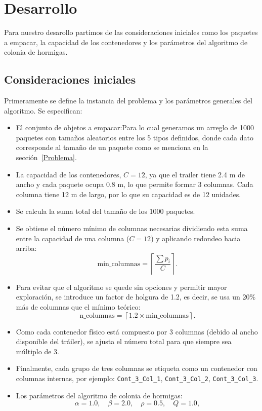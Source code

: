 \section{Desarrollo}

Para nuestro desarollo partimos de las consideraciones iniciales como los paquetes a empacar, la capacidad de los contenedores y los parámetros del 
algoritmo de colonia de hormigas.

\subsection{Consideraciones iniciales}

Primeramente se define la instancia del problema y los parámetros generales del algoritmo. Se especifican:

\begin{itemize}
    \item El conjunto de objetos a empacar:Para lo cual generamos un arreglo de 1000 paquetes con tamaños aleatorios entre los 5 tipos definidos,
    donde cada dato corresponde al tamaño de un paquete como se menciona en la sección~\ref{Problema}.
    \item La capacidad de los contenedores, $C = 12$, ya que el trailer tiene 2.4 m de ancho y cada 
    paquete ocupa 0.8 m, lo que permite formar 3 columnas. Cada columna tiene 12 m de largo, por lo que 
    su capacidad es de 12 unidades.
    \item Se calcula la suma total del tamaño de los 1000 paquetes.  
    \item Se obtiene el número mínimo de columnas necesarias dividiendo esta suma entre la 
    capacidad de una columna ($C = 12$) y aplicando redondeo hacia arriba:
    \[
        \text{min\_columnas} = \left\lceil \frac{\sum p_i}{C} \right\rceil.
    \]
    \item Para evitar que el algoritmo se quede sin opciones y permitir mayor exploración, se 
    introduce un factor de holgura de 1.2, es decir, se usa un 20\% más de columnas que el 
    mínimo teórico:
    \[
        \text{n\_columnas} = \left\lceil 1.2 \times \text{min\_columnas} \right\rceil.
    \]
    \item Como cada contenedor físico está compuesto por 3 columnas (debido al ancho disponible 
    del tráiler), se ajusta el número total para que siempre sea múltiplo de 3.
    \item Finalmente, cada grupo de tres columnas se etiqueta como un contenedor con columnas 
    internas, por ejemplo: \texttt{Cont\_3\_Col\_1}, \texttt{Cont\_3\_Col\_2}, \texttt{Cont\_3\_Col\_3}.
    \item Los parámetros del algoritmo de colonia de hormigas:
    \[
    \alpha = 1.0, \quad
    \beta = 2.0, \quad
    \rho = 0.5, \quad
    Q = 1.0,
    \]
\end{itemize}

